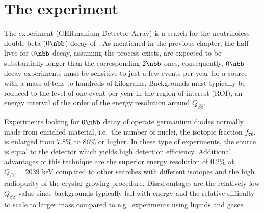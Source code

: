\chapter{The {\gerda} experiment}
The {\gerda} experiment (GERmanium Detector Array) is a search for the neutrinoless double-beta ($0\nbb$) decay of . As mentioned in the previous chapter, the half-lives for $0\nbb$ decay, assuming the process exists, are expected to be substantially longer than the corresponding $2\nbb$ ones, consequently, $0\nbb$ decay experiments must be sensitive to just a few events per year for a source with a mass of tens to hundreds of kilograms. Backgrounds must typically be reduced to the level of one event per year in the region of interest (ROI), an energy interval of the order of the energy resolution around $Q_{\beta\beta}$. 

Experiments looking for $0\nbb$ decay of  operate germanium diodes normally made from enriched material, i.e.~the number of  nuclei, the isotopic fraction $f_{76}$, is enlarged from 7.8\% to 86\% or higher. In these type of experiments, the source is equal to the detector which yields high detection efficiency. Additional advantages of this technique are the superior energy resolution of 0.2\% at $Q_{\beta\beta}=2039$ keV compared to other searches with different isotopes and the high radiopurity of the crystal growing procedure. Disadvantages are the relatively low $Q_{\beta\beta}$ value since backgrounds typically fall with energy and the relative difficulty to scale to larger mass compared to e.g.~experiments using liquids and gases.

